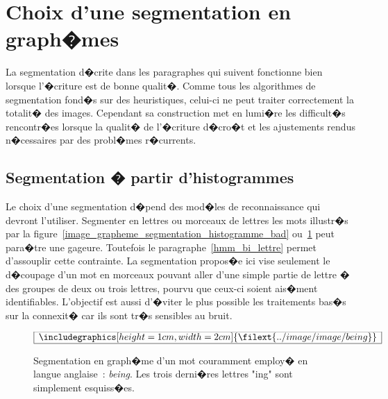 \section{Choix d'une segmentation en graph�mes}
\label{image_choix_segmentation}


La segmentation d�crite dans les paragraphes qui suivent fonctionne bien lorsque l'�criture est de bonne qualit�. Comme tous les algorithmes de segmentation fond�s sur des heuristiques, celui-ci ne peut traiter correctement la totalit� des images. Cependant sa construction met en lumi�re les difficult�s rencontr�es lorsque la qualit� de l'�criture d�cro�t et les ajustements rendus n�cessaires par des probl�mes r�currents.



\subsection{Segmentation � partir d'histogrammes}


Le choix d'une segmentation d�pend des mod�les de reconnaissance qui devront l'utiliser. Segmenter en lettres ou morceaux de lettres les mots illustr�s par la figure~\ref{image_grapheme_segmentation_histogramme_bad} ou~\ref{image_graphe_grapheme_ing} peut para�tre une gageure. Toutefois le paragraphe~\ref{hmm_bi_lettre} permet d'assouplir cette contrainte. La segmentation propos�e ici vise seulement le d�coupage d'un mot en morceaux pouvant aller d'une simple partie de lettre � des groupes de deux ou trois lettres, pourvu que ceux-ci soient ais�ment identifiables. L'objectif est aussi d'�viter le plus possible les traitements bas�s sur la connexit� car ils sont tr�s sensibles au bruit.


            \begin{figure}[ht]
        $$\frame{$\begin{array}[c]{c}\includegraphics[height=1cm, width=2cm]
        {\filext{../image/image/being}}\end{array}$}$$
        \caption{    Segmentation en graph�me d'un mot couramment employ� en langue anglaise~: \textit{being}.
                            Les trois derni�res lettres "ing" sont simplement esquiss�es.}
        \label{image_graphe_grapheme_ing}
            \end{figure}


